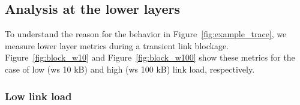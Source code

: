 \documentclass{article}
\begin{document}
\subsection{Analysis at the lower layers}

\begin{figure*}[!t]
\centerline{
\hfil
{}
\hfil
{}
\hfil
{}}
\caption{Blockage with low link load in practice. The long blockage in (a) is likely due to the automatic gain control adjustment of the SiversIMA converter.}
\label{fig:block_w10}
\vspace{-2mm}
\end{figure*}

\begin{figure*}[!t]
\centerline{
\hfil
{}
\hfil
{}
\hfil
{}}
\caption{Blockage with high link load in practice. The brief \ac{mcs} drop grayed out in (b) is not due to the blockage but occurred by chance in this measurement.}
\label{fig:block_w100}
\vspace{-1mm}
\end{figure*}

To understand the reason for the behavior in Figure~\ref{fig:example_trace}, we measure lower layer metrics during a transient link blockage. Figure~\ref{fig:block_w10} and Figure~\ref{fig:block_w100} show these metrics for the case of low (\ac{ws} 10 kB) and high (\ac{ws} 100 kB) link load, respectively.

\subsubsection{Low link load}
\end{document}
